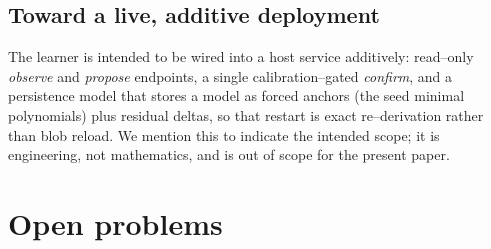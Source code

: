 \documentclass[11pt]{article}
\theoremstyle{plain}
\theoremstyle{definition}
\theoremstyle{remark}
\begin{document}
\subsection{Toward a live, additive deployment}
The learner is intended to be wired into a host service additively: read--only \emph{observe} and
\emph{propose} endpoints, a single calibration--gated \emph{confirm}, and a persistence model that stores a
model as forced anchors (the seed minimal polynomials) plus residual deltas, so that restart is exact
re--derivation rather than blob reload. We mention this to indicate the intended scope; it is engineering,
not mathematics, and is out of scope for the present paper.

\section{Open problems}\label{sec:open}
\end{document}
